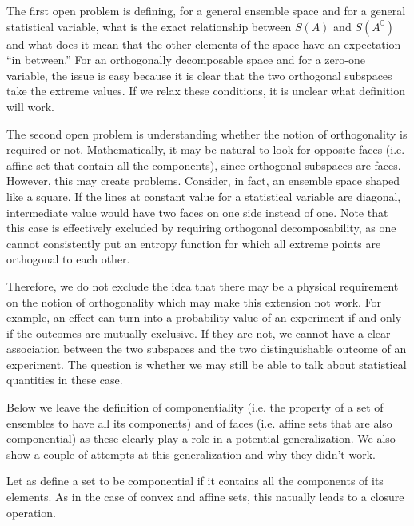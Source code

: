 The first open problem is defining, for a general ensemble space and for a general statistical variable, what is the exact relationship between $S(A)$ and $S(A^{\complement})$ and what does it mean that the other elements of the space have an expectation ``in between.'' For an orthogonally decomposable space and for a zero-one variable, the issue is easy because it is clear that the two orthogonal subspaces take the extreme values. If we relax these conditions, it is unclear what definition will work.

The second open problem is understanding whether the notion of orthogonality is required or not. Mathematically, it may be natural to look for opposite faces (i.e. affine set that contain all the components), since orthogonal subspaces are faces. However, this may create problems. Consider, in fact, an ensemble space shaped like a square. If the lines at constant value for a statistical variable are diagonal, intermediate value would have two faces on one side instead of one. Note that this case is effectively excluded by requiring orthogonal decomposability, as one cannot consistently put an entropy function for which all extreme points are orthogonal to each other.

Therefore, we do not exclude the idea that there may be a physical requirement on the notion of orthogonality which may make this extension not work. For example, an effect can turn into a probability value of an experiment if and only if the outcomes are mutually exclusive. If they are not, we cannot have a clear association between the two subspaces and the two distinguishable outcome of an experiment. The question is whether we may still be able to talk about statistical quantities in these case. 

Below we leave the definition of componentiality (i.e. the property of a set of ensembles to have all its components) and of faces (i.e. affine sets that are also componential) as these clearly play a role in a potential generalization. We also show a couple of attempts at this generalization and why they didn't work.

Let as define a set to be componential if it contains all the components of its elements. As in the case of convex and affine sets, this natually leads to a closure operation.

